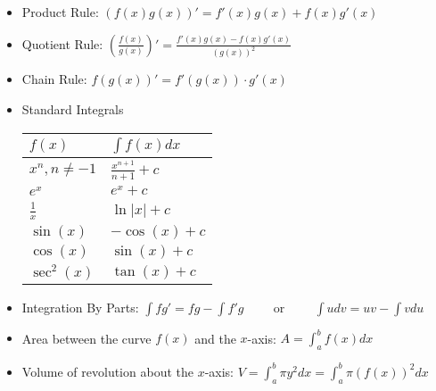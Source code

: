 \begin{itemize}
	\item Product Rule: $(f(x)g(x))' = f'(x)g(x) + f(x)g'(x)$
	\item Quotient Rule: $\displaystyle \left(\frac{f(x)}{g(x)}\right)' = \frac{f'(x)g(x) - f(x)g'(x)}{(g(x))^2}$
	\item Chain Rule: $f(g(x))' = f'(g(x)) \cdot g'(x)$
	\item Standard Integrals
	\renewcommand{\arraystretch}{1.2}
	\setlength{\tabcolsep}{1.5em}
	\begin{table}[h]\vspace{-0.6cm}
		\centering
		\label{my-label}
		\begin{tabular}{ll}
			\hline
			$f(x)$  &  $\int f(x)dx$ \\ \hline
			$x^n, n \neq -1$ & $\frac{x^{n+1}}{n+1}+c$\\ 
			$e^x$ & $e^x+c$\\ 
			$\frac{1}{x}$ & $\ln|x|+c$\\ 
			$\sin(x)$ & $-\cos(x)+c$ \\ 
			$\cos(x)$ & $\sin(x)+c$ \\ 
			$\sec^2(x)$ & $\tan(x)+c$ \\ \hline
		\end{tabular}
	\end{table}
	\item Integration By Parts: $\displaystyle \int fg' = fg-\int f'g \hspace{1cm} \text{or} \hspace{1cm} \int udv = uv - \int vdu$
	\item Area between the curve $f(x)$ and the $x$-axis: $\displaystyle A=\int_{a}^{b} f(x)dx$\\
	\item Volume of revolution about the $x$-axis:
	$\displaystyle V= \int_{a}^{b} \pi y^2 dx = \int_{a}^{b} \pi (f(x))^2 dx$
\end{itemize}
